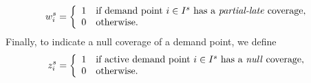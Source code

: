 \begin{equation*}
       w^s_{i} = \left\{
       \begin{array}{ll} 
        1 & \text{if demand point  } i\in I^s \text{ has a \textit{partial-late} coverage}, \\
         0 & \text{otherwise}.
       \end{array} \right.
\end{equation*}
Finally, to indicate a null coverage of a demand point, we define
\begin{equation*}
       z^s_{i} = \left\{
       \begin{array}{ll} 
        1 & \text{if active demand point  } i\in I^s \text{ has a \textit{null} coverage}, \\
         0 & \text{otherwise}.
       \end{array} \right.
\end{equation*}


 

